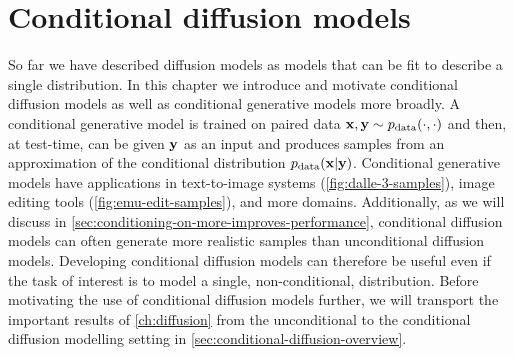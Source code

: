 \chapter{Conditional diffusion models} \label{ch:conditional-diffusion}

So far we have described diffusion models as models that can be fit to describe a single distribution. In this chapter we introduce and motivate conditional diffusion models as well as conditional generative models more broadly. A conditional generative model is trained on paired data ${\mathbf{x}}, {\mathbf{y}} \sim p_\text{data}(\cdot, \cdot)$ and then, at test-time, can be given ${\mathbf{y}}$ as an input and produces samples from an approximation of the conditional distribution $p_\text{data}({\mathbf{x}}|{\mathbf{y}})$. Conditional generative models have applications in text-to-image systems (\cref{fig:dalle-3-samples}), image editing tools (\cref{fig:emu-edit-samples}), and more domains. Additionally, as we will discuss in \cref{sec:conditioning-on-more-improves-performance}, conditional diffusion models can often generate more realistic samples than unconditional diffusion models. Developing conditional diffusion models can therefore be useful even if the task of interest is to model a single, non-conditional, distribution. Before motivating the use of conditional diffusion models further, we will transport the important results of \cref{ch:diffusion} from the unconditional to the conditional diffusion modelling setting in \cref{sec:conditional-diffusion-overview}.

